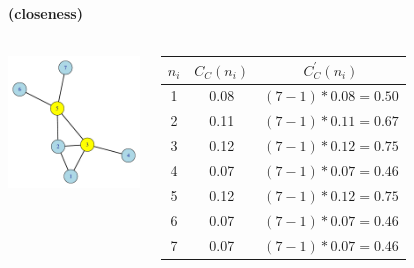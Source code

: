 \documentclass[8pt]{beamer}
\begin{document}
\begin{frame}
\frametitle{\insertsection}
\framesubtitle{\insertsubsection \hspace{0.05cm} (closeness)}

\begin{columns}
	\centering 
	\includegraphics[width=5cm]{closeness}
	
	\small
	\renewcommand{\arraystretch}{1.5}
	\begin{table}
	\begin{tabular}{ccc}
		\toprule
	$n_i$ & $C_C(n_i) $ & $C_C^{'}(n_i)$\\
	\hline
	1 & 0.08 & $(7-1)*0.08=0.50$\\
	2 & 0.11 & $(7-1)*0.11=0.67$\\
	3 & 0.12 & $(7-1)*0.12=0.75$\\
	4 & 0.07 & $(7-1)*0.07=0.46$\\
	5 & 0.12 & $(7-1)*0.12=0.75$\\
	6 & 0.07 & $(7-1)*0.07=0.46$\\
	7 & 0.07 & $(7-1)*0.07=0.46$\\
	\bottomrule
	\end{tabular}
	\end{table}
\end{columns}
\end{frame}

\end{document}
